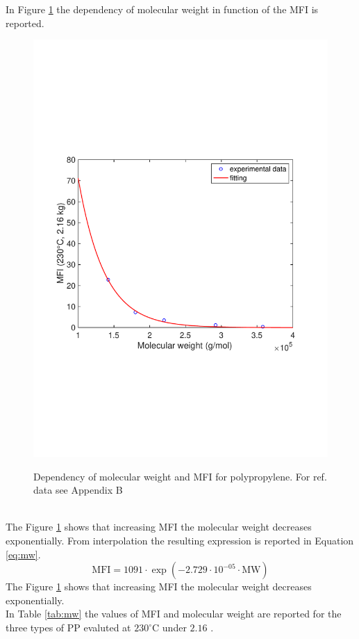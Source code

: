 \documentclass[a4paper, 11pt]{article}
\begin{document}
In Figure \ref{fig:mw} the dependency of molecular weight in function of the MFI is reported.
\begin{figure}[h!]
	\centering
	{\includegraphics[scale=0.4]{mw}}
	\captionsetup{justification=centering}
	\caption{Dependency of molecular weight and MFI for polypropylene. For ref. data see Appendix B}
	\label{fig:mw}
\end{figure}\\
The Figure \ref{fig:mw} shows that increasing MFI the molecular weight decreases exponentially. From interpolation the resulting expression is reported in Equation \ref{eq:mw}. 
\begin{equation}
\text{MFI} = 1091\cdot \exp({-2.729\cdot 10^{-05}\cdot\text{MW}})
\label{eq:mw}
\end{equation}
The Figure \ref{fig:mw} shows that increasing MFI the molecular weight decreases exponentially.\\ In Table \ref{tab:mw} the values of MFI and molecular weight are reported for the three types of PP evaluted at $230 ^\circ$C under $2.16$ .
\end{document}
